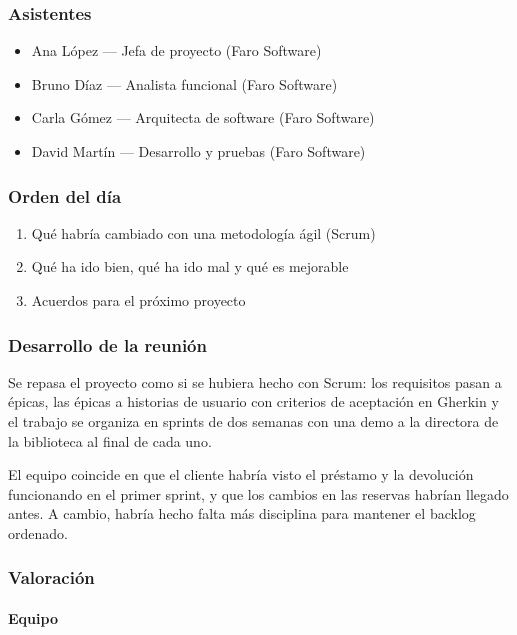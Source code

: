 \subsubsection*{Asistentes}

\begin{itemize}
\item Ana López — Jefa de proyecto (Faro Software)
\item Bruno Díaz — Analista funcional (Faro Software)
\item Carla Gómez — Arquitecta de software (Faro Software)
\item David Martín — Desarrollo y pruebas (Faro Software)
\end{itemize}

\subsubsection*{Orden del día}

\begin{enumerate}
\item Qué habría cambiado con una metodología ágil (Scrum)
\item Qué ha ido bien, qué ha ido mal y qué es mejorable
\item Acuerdos para el próximo proyecto
\end{enumerate}

\subsubsection*{Desarrollo de la reunión}

Se repasa el proyecto como si se hubiera hecho con Scrum: los requisitos pasan a épicas, las épicas a historias de usuario con criterios de aceptación en Gherkin y el trabajo se organiza en sprints de dos semanas con una demo a la directora de la biblioteca al final de cada uno.

El equipo coincide en que el cliente habría visto el préstamo y la devolución funcionando en el primer sprint, y que los cambios en las reservas habrían llegado antes. A cambio, habría hecho falta más disciplina para mantener el backlog ordenado.

\subsubsection*{Valoración}

\paragraph*{Equipo}

